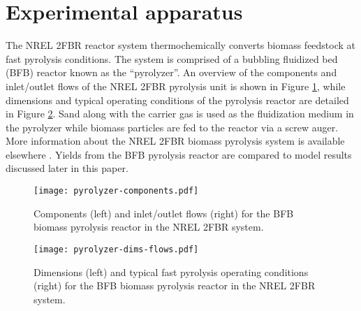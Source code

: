 
\section{Experimental apparatus}

The NREL 2FBR reactor system thermochemically converts biomass feedstock at fast pyrolysis conditions. The system is comprised of a bubbling fluidized bed (BFB) reactor known as the ``pyrolyzer''. An overview of the components and inlet/outlet flows of the NREL 2FBR pyrolysis unit is shown in Figure \ref{fig:pyrolyzer-components}, while dimensions and typical operating conditions of the pyrolysis reactor are detailed in Figure \ref{fig:pyrolyzer-dims-flows}. Sand along with the carrier gas is used as the fluidization medium in the pyrolyzer while biomass particles are fed to the reactor via a screw auger. More information about the NREL 2FBR biomass pyrolysis system is available elsewhere \cite{Howe-2015, Trendewicz-2015}. Yields from the BFB pyrolysis reactor are compared to model results discussed later in this paper.

\begin{figure}[H]
    \centering
    \texttt{[image: pyrolyzer-components.pdf]}
    \caption{Components (left) and inlet/outlet flows (right) for the BFB biomass pyrolysis reactor in the NREL 2FBR system.}
    \label{fig:pyrolyzer-components}
\end{figure}

\begin{figure}[H]
    \centering
    \texttt{[image: pyrolyzer-dims-flows.pdf]}
    \caption{Dimensions (left) and typical fast pyrolysis operating conditions (right) for the BFB biomass pyrolysis reactor in the NREL 2FBR system.}
    \label{fig:pyrolyzer-dims-flows}
\end{figure}
